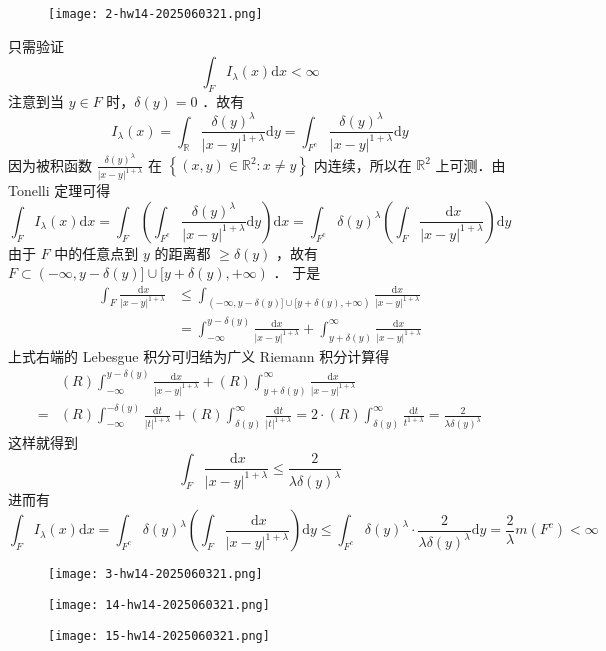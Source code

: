 \begin{exercise}
\begin{figure}[H]
\centering
\texttt{[image: 2-hw14-2025060321.png]}
\label{}
\end{figure}
\end{exercise}
只需验证
\[
\int_F I_\lambda(x) \mathrm{d} x<\infty
\]
注意到当 $y \in F$ 时，$\delta(y)=0$ ．故有
\[
I_\lambda(x)=\int_{\mathbb{R}} \frac{\delta(y)^\lambda}{|x-y|^{1+\lambda}} \mathrm{d} y=\int_{F^c} \frac{\delta(y)^\lambda}{|x-y|^{1+\lambda}} \mathrm{d} y
\]
因为被积函数 $\frac{\delta(y)^\lambda}{|x-y|^{1+\lambda}}$ 在 $\left\{(x, y) \in \mathbb{R}^2: x \neq y\right\}$ 内连续，所以在 $\mathbb{R}^2$ 上可测．由 Tonelli 定理可得
\[
\int_F I_\lambda(x) \mathrm{d} x=\int_F\left(\int_{F^c} \frac{\delta(y)^\lambda}{|x-y|^{1+\lambda}} \mathrm{d} y\right) \mathrm{d} x=\int_{F^c} \delta(y)^\lambda\left(\int_F \frac{\mathrm{~d} x}{|x-y|^{1+\lambda}}\right) \mathrm{d} y
\]
由于 $F$ 中的任意点到 $y$ 的距离都 $\geqslant \delta(y)$ ，故有 $F \subset(-\infty, y-\delta(y)] \cup[y+\delta(y),+\infty)$ ．
于是
\[
\begin{aligned}
\int_F \frac{\mathrm{~d} x}{|x-y|^{1+\lambda}} & \leqslant \int_{(-\infty, y-\delta(y)] \cup[y+\delta(y),+\infty)} \frac{\mathrm{d} x}{|x-y|^{1+\lambda}} \\
& =\int_{-\infty}^{y-\delta(y)} \frac{\mathrm{d} x}{|x-y|^{1+\lambda}}+\int_{y+\delta(y)}^{\infty} \frac{\mathrm{d} x}{|x-y|^{1+\lambda}}
\end{aligned}
\]
上式右端的 Lebesgue 积分可归结为广义 Riemann 积分计算得
\[
\begin{aligned}
& (R) \int_{-\infty}^{y-\delta(y)} \frac{\mathrm{d} x}{|x-y|^{1+\lambda}}+(R) \int_{y+\delta(y)}^{\infty} \frac{\mathrm{d} x}{|x-y|^{1+\lambda}} \\
= & (R) \int_{-\infty}^{-\delta(y)} \frac{\mathrm{d} t}{|t|^{1+\lambda}}+(R) \int_{\delta(y)}^{\infty} \frac{\mathrm{d} t}{|t|^{1+\lambda}}=2 \cdot(R) \int_{\delta(y)}^{\infty} \frac{\mathrm{d} t}{t^{1+\lambda}}=\frac{2}{\lambda \delta(y)^\lambda}
\end{aligned}
\]
这样就得到
\[
\int_F \frac{\mathrm{~d} x}{|x-y|^{1+\lambda}} \leqslant \frac{2}{\lambda \delta(y)^\lambda}
\]
进而有
\[
\int_F I_\lambda(x) \mathrm{d} x=\int_{F^c} \delta(y)^\lambda\left(\int_F \frac{\mathrm{~d} x}{|x-y|^{1+\lambda}}\right) \mathrm{d} y \leqslant \int_{F^c} \delta(y)^\lambda \cdot \frac{2}{\lambda \delta(y)^\lambda} \mathrm{d} y=\frac{2}{\lambda} m\left(F^c\right)<\infty
\]
\begin{exercise}
\begin{figure}[H]
\centering
\texttt{[image: 3-hw14-2025060321.png]}
\label{}
\end{figure}
\end{exercise}
\begin{figure}[H]
\centering
\texttt{[image: 14-hw14-2025060321.png]}
\label{}
\end{figure}
\begin{figure}[H]
\centering
\texttt{[image: 15-hw14-2025060321.png]}
\label{}
\end{figure}

